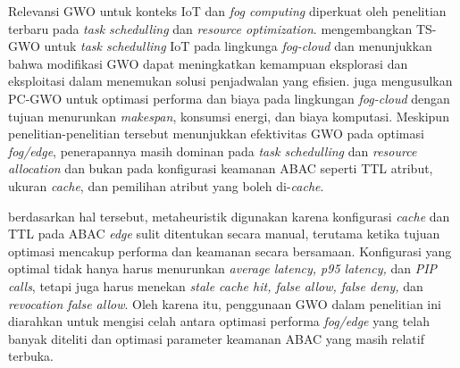 Relevansi GWO untuk konteks IoT dan \textit{fog computing} diperkuat oleh penelitian terbaru pada \textit{task schedulling} dan \textit{resource optimization}. \textcite{alsadie_modified_2025} mengembangkan TS-GWO untuk \textit{task schedulling} IoT pada lingkunga \textit{fog-cloud} dan menunjukkan bahwa modifikasi GWO dapat meningkatkan kemampuan eksplorasi dan eksploitasi dalam menemukan solusi penjadwalan yang efisien. \textcite{alsamarai_improved_2024} juga mengusulkan PC-GWO untuk optimasi performa dan biaya pada lingkungan \textit{fog-cloud} dengan tujuan menurunkan \textit{makespan}, konsumsi energi, dan biaya komputasi. Meskipun penelitian-penelitian tersebut menunjukkan efektivitas GWO pada optimasi \textit{fog/edge}, penerapannya masih dominan pada \textit{task schedulling} dan \textit{resource allocation} dan bukan pada konfigurasi keamanan ABAC seperti TTL atribut, ukuran \textit{cache}, dan pemilihan atribut yang boleh di-\textit{cache}.

berdasarkan hal tersebut, metaheuristik digunakan karena konfigurasi \textit{cache} dan TTL pada ABAC \textit{edge} sulit ditentukan secara manual, terutama ketika tujuan optimasi mencakup performa dan keamanan secara bersamaan. Konfigurasi yang optimal tidak hanya harus menurunkan \textit{average latency, p95 latency,} dan \textit{PIP calls}, tetapi juga harus menekan \textit{stale cache hit, false allow, false deny,} dan \textit{revocation false allow}. Oleh karena itu, penggunaan GWO dalam penelitian ini diarahkan untuk mengisi celah antara optimasi performa \textit{fog/edge} yang telah banyak diteliti dan optimasi parameter keamanan ABAC yang masih relatif terbuka.